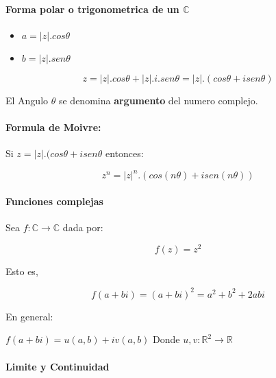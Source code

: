\documentclass[10pt]{article}
\begin{document}
\paragraph{Forma polar o trigonometrica de un $\mathbb{C}$}

\begin{itemize}
	\item $a = |z|.cos \theta$
	\item $b = |z|.sen \theta$
\end{itemize}

\begin{equation*}
	z = |z|.cos\theta + |z|.i.sen\theta = |z|.(cos\theta+isen\theta) 
\end{equation*}

El Angulo $\theta$ se denomina \textbf{argumento} del numero complejo.\\

\paragraph{Formula de Moivre: }

Si $z = |z|.(cos\theta+isen\theta$ entonces:

\begin{equation*}
	z^n = |z|^n.(cos(n\theta)+isen(n\theta))
\end{equation*}

\paragraph{Funciones complejas}

Sea $f:\mathbb{C}\rightarrow\mathbb{C}$ dada por:

\begin{equation*}
	f(z) = z^2
\end{equation*}

Esto es,

\begin{equation*}
	f(a+bi) = (a+bi)^2 = a^2+b^2+2abi
\end{equation*}

En general:

\begin{center}
	$f(a+bi) = u(a,b)+ iv(a,b)$ Donde $u,v: \mathbb{R}^2 \rightarrow \mathbb{R}$ 
\end{center}

\paragraph{Limite y Continuidad} 
\end{document}
